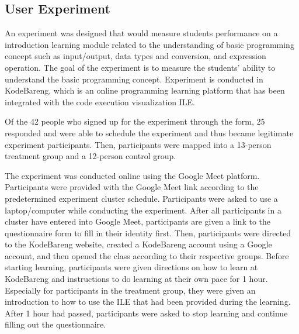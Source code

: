 \documentclass[conference]{IEEEtran}
\begin{document}
\subsection{User Experiment}
An experiment was designed that would measure students performance on a introduction learning module related to the understanding of basic programming concept such as input/output, data types and conversion, and expression operation. The goal of the experiment is to measure the students' ability to understand the basic programming concept. Experiment is conducted in KodeBareng, which is an online programming learning platform that has been integrated with the code execution visualization ILE.

Of the 42 people who signed up for the experiment through the form, 25 responded and were able to schedule the experiment and thus became legitimate experiment participants. Then, participants were mapped into a 13-person treatment group and a 12-person control group.

The experiment was conducted online using the Google Meet platform. Participants were provided with the Google Meet link according to the predetermined experiment cluster schedule. Participants were asked to use a laptop/computer while conducting the experiment. After all participants in a cluster have entered into Google Meet, participants are given a link to the questionnaire form to fill in their identity first. Then, participants were directed to the KodeBareng website, created a KodeBareng account using a Google account, and then opened the class according to their respective groups. Before starting learning, participants were given directions on how to learn at KodeBareng and instructions to do learning at their own pace for 1 hour. Especially for participants in the treatment group, they were given an introduction to how to use the ILE that had been provided during the learning. After 1 hour had passed, participants were asked to stop learning and continue filling out the questionnaire.
\end{document}
